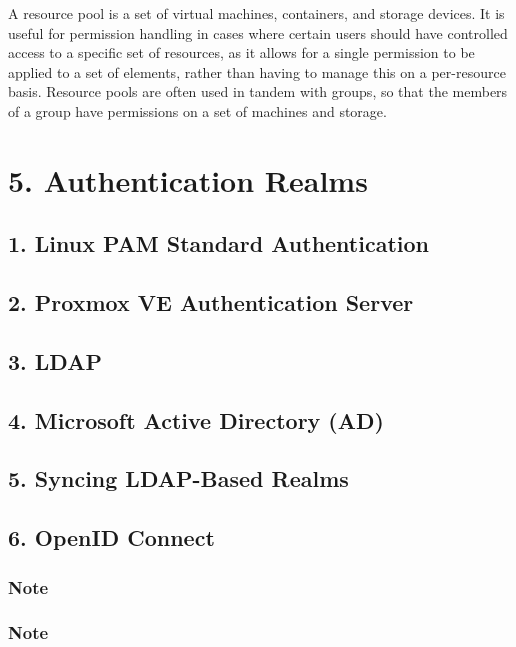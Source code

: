 A resource pool is a set of virtual machines, containers, and storage devices. It is useful for permission handling in cases where certain users should have controlled access to a specific set of resources, as it allows for a single permission to be applied to a set of elements, rather than having to manage this on a per-resource basis. Resource pools are often used in tandem with groups, so that the members of a group have permissions on a set of machines and storage.


\section{5. Authentication Realms}

\subsection{1. Linux PAM Standard Authentication}

\subsection{2. Proxmox VE Authentication Server}

\subsection{3. LDAP}

\subsection{4. Microsoft Active Directory (AD)}

\subsection{5. Syncing LDAP-Based Realms}

\subsection{6. OpenID Connect}

\subsubsection{Note}

\subsubsection{Note}

